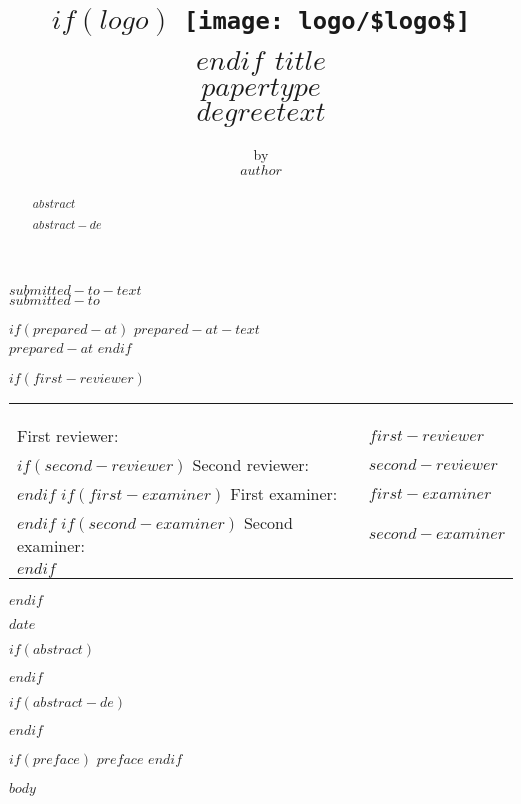 \documentclass[11pt,a4paper,twoside,openright,openbib]{memoir}
\author{
  \small{by} \vspace{.5cm} 											\\
	\Large{\textbf{$author$}}}
\title{
	\textbf{\vspace{-2.5cm}
	$if(logo)$
	  \texttt{[image: logo/\$logo\$]} \\
	$endif$
	\vspace{3cm}\Huge{$title$} }\\
	\vspace{1cm}
	\Large{\textbf{$papertype$}}\\
	\vspace{0.2cm}
	\normalsize{$degreetext$}}
\date{}
\begin{document}
\frontmatter

\begin{titlingpage}
  \begin{center}
    \maketitle
    \vspace{-1cm}
    \small{$submitted-to-text$} \\
    \small{$submitted-to$}

    $if(prepared-at)$
    \vspace{0.5cm}
    \small{$prepared-at-text$} \\
    \small{$prepared-at$}
    $endif$

    $if(first-reviewer)$
    \begin{tabular}{ll}
    & \\
    & \\
    & \\
    First reviewer: & $first-reviewer$ \\
    $if(second-reviewer)$
    Second reviewer: & $second-reviewer$ \\
    $endif$
    $if(first-examiner)$
    First examiner: & $first-examiner$ \\
    $endif$
    $if(second-examiner)$
    Second examiner: & $second-examiner$ \\
    $endif$
    & \\
    \end{tabular}
    $endif$

    \vspace{\fill}
    \small{$date$}
  \end{center}
\end{titlingpage}

\setcounter{page}{1}

$if(abstract)$
  \abstractintoc
  \abstractnum
  \begin{abstract}
  $abstract$
  \end{abstract}
$endif$

$if(abstract-de)$
  \cleardoublepage
  \abstractintoc
  \abstractnum
  \begin{abstract}
  $abstract-de$
  \end{abstract}
$endif$

\cleardoublepage

\tableofcontents*

\cleardoublepage

\listoffigures

\cleardoublepage

$if(preface)$
  $preface$
$endif$

\mainmatter
$body$
\end{document}
